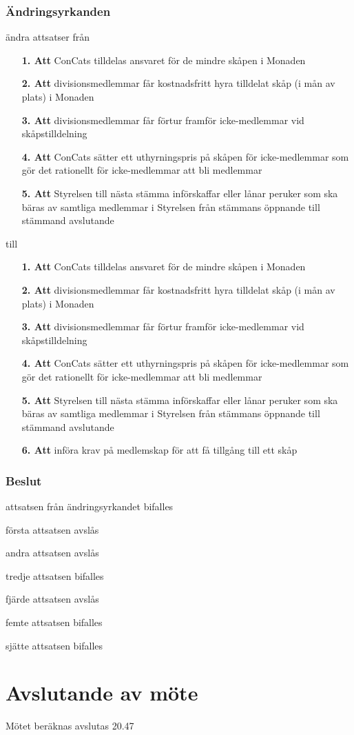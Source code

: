 \documentclass[protokoll]{dvd}
\begin{document}
\subsubsection*{Ändringsyrkanden}
\begin{attsatser}
	\item ändra attsatser från 
	\begin{enumerate}
		\item[\textbf{1. Att}] ConCats tilldelas ansvaret för de mindre skåpen i Monaden
		\item[\textbf{2. Att}] divisionsmedlemmar får kostnadsfritt hyra tilldelat skåp (i mån av plats) i Monaden
		\item[\textbf{3. Att}] divisionsmedlemmar får förtur framför icke-medlemmar vid skåpstilldelning
		\item[\textbf{4. Att}] ConCats sätter ett uthyrningspris på skåpen för icke-medlemmar som gör det rationellt för icke-medlemmar att bli medlemmar
		\item[\textbf{5. Att}] Styrelsen till nästa stämma införskaffar eller lånar peruker som ska bäras av samtliga medlemmar i Styrelsen från stämmans öppnande till stämmand avslutande
	\end{enumerate} till
	\begin{enumerate}
		\item[\textbf{1. Att}] ConCats tilldelas ansvaret för de mindre skåpen i Monaden
		\item[\textbf{2. Att}] divisionsmedlemmar får kostnadsfritt hyra tilldelat skåp (i mån av plats) i Monaden
		\item[\textbf{3. Att}] divisionsmedlemmar får förtur framför icke-medlemmar vid skåpstilldelning
		\item[\textbf{4. Att}] ConCats sätter ett uthyrningspris på skåpen för icke-medlemmar som gör det rationellt för icke-medlemmar att bli medlemmar
		\item[\textbf{5. Att}] Styrelsen till nästa stämma införskaffar eller lånar peruker som ska bäras av samtliga medlemmar i Styrelsen från stämmans öppnande till stämmand avslutande
		\item[\textbf{6. Att}] införa krav på medlemskap för att få tillgång till ett skåp
	\end{enumerate}
\end{attsatser}

\subsubsection*{Beslut}
\begin{attsatser}
    \item attsatsen från ändringsyrkandet bifalles
	\item första attsatsen avslås
	\item andra attsatsen avslås
	\item tredje attsatsen bifalles
	\item fjärde attsatsen avslås
	\item femte attsatsen bifalles
	\item sjätte attsatsen bifalles
\end{attsatser}
\newpage

\section{Avslutande av möte}

Mötet beräknas avslutas 20.47

\end{document}
